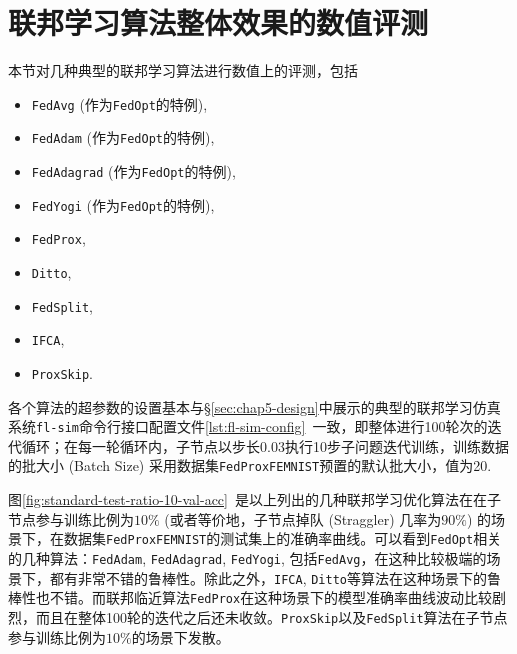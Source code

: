 \section{联邦学习算法整体效果的数值评测}
\label{sec:chap6-overall}


本节对几种典型的联邦学习算法进行数值上的评测，包括
\begin{itemize}
    \item \texttt{FedAvg}\cite{mcmahan2017fed_avg} (作为\texttt{FedOpt}\cite{reddi2020fed_opt}的特例),
    \item \texttt{FedAdam}\cite{reddi2020fed_opt, adam} (作为\texttt{FedOpt}\cite{reddi2020fed_opt}的特例),
    \item \texttt{FedAdagrad}\cite{reddi2020fed_opt, adagrad} (作为\texttt{FedOpt}\cite{reddi2020fed_opt}的特例),
    \item \texttt{FedYogi}\cite{reddi2020fed_opt, Zaheer_2018_yogi} (作为\texttt{FedOpt}\cite{reddi2020fed_opt}的特例),
    \item \texttt{FedProx}\cite{sahu2018fedprox},
    \item \texttt{Ditto}\cite{li_2021_ditto},
    \item \texttt{FedSplit}\cite{pathak2020fedsplit},
    \item \texttt{IFCA}\cite{Ghosh_2022_cfl},
    \item \texttt{ProxSkip}\cite{proxskip}.
\end{itemize}
各个算法的超参数的设置基本与\S\ref{sec:chap5-design}中展示的典型的联邦学习仿真系统\texttt{fl-sim}命令行接口配置文件\ref{lst:fl-sim-config}~一致，即整体进行100轮次的迭代循环；在每一轮循环内，子节点以步长0.03执行10步子问题迭代训练，训练数据的批大小 (Batch Size) 采用数据集\texttt{FedProxFEMNIST}预置的默认批大小，值为20.

图\ref{fig:standard-test-ratio-10-val-acc}~是以上列出的几种联邦学习优化算法在在子节点参与训练比例为$10\%$ (或者等价地，子节点掉队 (Straggler) 几率为$90\%$) 的场景下，在数据集\texttt{FedProxFEMNIST}的测试集上的准确率曲线。可以看到\texttt{FedOpt}相关的几种算法：\texttt{FedAdam}, \texttt{FedAdagrad}, \texttt{FedYogi}, 包括\texttt{FedAvg}，在这种比较极端的场景下，都有非常不错的鲁棒性。除此之外，\texttt{IFCA}, \texttt{Ditto}等算法在这种场景下的鲁棒性也不错。而联邦临近算法\texttt{FedProx}在这种场景下的模型准确率曲线波动比较剧烈，而且在整体100轮的迭代之后还未收敛。\texttt{ProxSkip}以及\texttt{FedSplit}算法在子节点参与训练比例为$10\%$的场景下发散。

